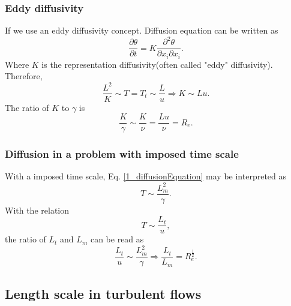 \documentclass[review]{elsarticle}
\numberwithin{equation}{section}
\begin{document}
		\subsubsection 	{Eddy diffusivity}
			If we use an eddy diffusivity concept. Diffusion equation can be written as
			\begin{equation}
				\frac{\partial \theta}{\partial {t}}=K \frac{\partial ^2\theta}{\partial x_i\partial x_i}.
			\end{equation} 
			Where $K$ is the representation diffusivity(often called "eddy" diffusivity). Therefore, 
			\begin{equation}
				\frac{L^2}{K} \sim T = T_t \sim \frac{L}{u} \Rightarrow K \sim Lu.
			\end{equation}
			The ratio of $K$ to $\gamma$ is
			\begin{equation}
				\frac{K}{\gamma} \sim \frac{K}{\nu}=\frac{Lu}{\nu}=R_e.
			\end{equation}
			\begin{center}
			\end{center}			
		\subsubsection{Diffusion in a problem with imposed time scale}
			With a imposed time scale, Eq. \ref{1_diffusionEquation} may be interpreted as
			\begin{equation} 
				T \sim \frac{L_m^2}{\gamma}.
			\end{equation}
			With the relation
			\begin{equation}
				T \sim \frac{L_t}{u},
			\end{equation}
			the ratio of $L_t$ and $L_m$ can be read as
			\begin{equation}
				\frac{L_t}{u} \sim \frac{L_m^2}{\gamma} \Rightarrow \frac{L_t}{L_m} = R_e^{\frac{1}{2}}.
			\end{equation}
	\subsection {Length scale in turbulent flows}
\end{document}
